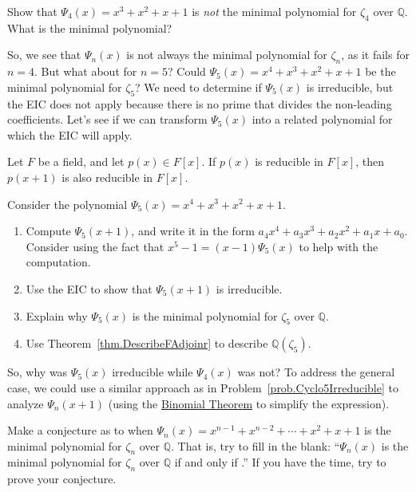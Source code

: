 \begin{problem}
Show that $\Psi_4(x)=x^3+x^2+x+1$ is \emph{not} the minimal polynomial for $\zeta_4$ over $\mathbb{Q}$. What is the minimal polynomial? 
\end{problem}

So, we see that $\Psi_n(x)$ is not always the minimal polynomial for $\zeta_n$, as it fails for $n=4$. But what about for $n=5$? Could $\Psi_5(x) = x^4+x^3+x^2+x+1$ be the minimal polynomial for $\zeta_5$? We need to determine if $\Psi_5(x)$ is irreducible, but the EIC does not apply because there is no prime that divides the non-leading coefficients. Let's see if we can transform  $\Psi_5(x)$ into a related polynomial for which the EIC will apply.

\begin{theorem}
Let $F$ be a field, and let $p(x) \in F[x]$. If $p(x)$ is reducible in $F[x]$, then $p(x+1)$ is also reducible in $F[x]$.
\end{theorem}

\begin{problem}\label{prob.Cyclo5Irreducible}
Consider the polynomial $\Psi_5(x) = x^4+x^3+x^2+x+1$.
\begin{enumerate}
\item Compute $\Psi_5(x+1)$, and write it in the form $a_4x^4+a_3x^3+a_2x^2+a_1x+a_0$. Consider using the fact that $x^5 - 1 = (x-1)\Psi_5(x)$ to help with the computation.
\item Use the EIC to show that $\Psi_5(x+1)$ is irreducible. 
\item Explain why $\Psi_5(x)$ is the minimal polynomial for $\zeta_5$ over $\mathbb{Q}$.
\item Use Theorem~\ref{thm.DescribeFAdjoinr} to describe $\mathbb{Q}(\zeta_5)$.
\end{enumerate}
\end{problem}

So, why was $\Psi_5(x)$ irreducible while $\Psi_4(x)$ was not? To address the general case, we could use a similar approach as in Problem~\ref{prob.Cyclo5Irreducible} to analyze $\Psi_n(x+1)$ (using the \href{https://en.wikipedia.org/wiki/Binomial_theorem}{Binomial Theorem} to simplify the expression). 

\begin{problem}
Make a conjecture as to when $\Psi_n(x) =  x^{n-1} + x^{n-2} + \cdots + x^2 + x + 1$ is the minimal polynomial for $\zeta_n$ over $\mathbb{Q}$. That is, try to fill in the blank: ``$\Psi_n(x)$ is the minimal polynomial for $\zeta_n$ over $\mathbb{Q}$ if and only if .'' If you have the time, try to prove your conjecture. 
\end{problem}

